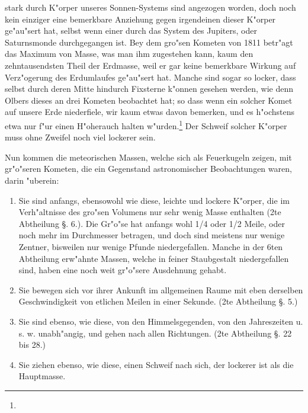 \documentclass[a4paper, 11pt, oneside, polutonikogreek, german]{article}
\begin{document}
stark durch K"orper unseres Sonnen-Systems sind angezogen worden, doch noch kein einziger eine bemerkbare Anziehung gegen irgendeinen dieser K"orper ge"au"sert hat, selbst wenn einer durch das System des Jupiters, oder Saturnsmonde durchgegangen ist. Bey dem gro"sen Kometen von 1811 betr"agt das Maximum von Masse, was man ihm zugestehen kann, kaum den zehntausendsten Theil der Erdmasse, weil er gar keine bemerkbare Wirkung auf Verz"ogerung des Erdumlaufes ge"au"sert hat. Manche sind sogar so locker, dass selbst durch deren Mitte hindurch Fixsterne k"onnen gesehen werden, wie denn Olbers dieses an drei Kometen beobachtet hat; so dass wenn ein solcher Komet auf unsere Erde niederfiele, wir kaum etwas davon bemerken, und es h"ochstens etwa nur f"ur einen H"oherauch halten w"urden.\footnote{} Der Schweif solcher K"orper muss ohne Zweifel noch viel lockerer sein.

Nun kommen die meteorischen Massen, welche sich als Feuerkugeln zeigen, mit gr"o"seren Kometen, die ein Gegenstand astronomischer Beobachtungen waren, darin "uberein:
\begin{enumerate}
    \item Sie sind anfangs, ebensowohl wie diese, leichte und lockere K"orper, die im Verh"altnisse des gro"sen Volumens nur sehr wenig Masse enthalten (2te Abtheilung §. 6.). Die Gr"o"se hat anfangs wohl 1/4 oder 1/2 Meile, oder noch mehr im Durchmesser betragen, und doch sind meistens nur wenige Zentner, bisweilen nur wenige Pfunde niedergefallen. Manche in der 6ten Abtheilung erw"ahnte Massen, welche in feiner Staubgestalt niedergefallen sind, haben eine noch weit gr"o"sere Ausdehnung gehabt.
    \item Sie bewegen sich vor ihrer Ankunft im allgemeinen Raume mit eben derselben Geschwindigkeit von etlichen Meilen in einer Sekunde. (2te Abtheilung §. 5.)
    \item Sie sind ebenso, wie diese, von den Himmelsgegenden, von den Jahreszeiten u. s. w. unabh"angig, und gehen nach allen Richtungen. (2te Abtheilung §. 22 bis 28.)
    \item Sie ziehen ebenso, wie diese, einen Schweif nach sich, der lockerer ist als die Hauptmasse.
\end{enumerate}
\end{document}
